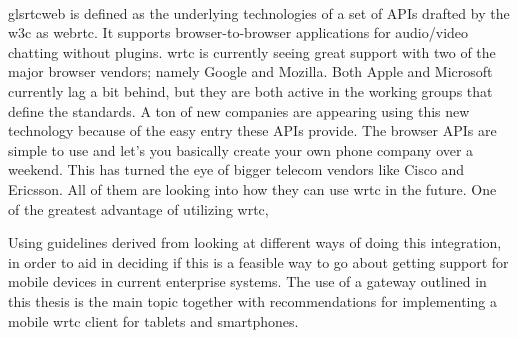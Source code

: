 \\gls{rtcweb} is defined as the underlying technologies of a set of APIs drafted by the \gls{w3c} as \gls{webrtc}. It supports browser-to-browser applications for audio/video chatting without plugins. \gls{wrtc} is currently seeing great support with two of the major browser vendors; namely Google and Mozilla. Both Apple and Microsoft currently lag a bit behind, but they are both active in the working groups that define the standards. A ton of new companies are appearing using this new technology because of the easy entry these APIs provide. The browser APIs are simple to use and let's you basically create your own phone company over a weekend. This has turned the eye of bigger telecom vendors like Cisco and Ericsson. All of them are looking into how they can use \gls{wrtc} in the future. One of the greatest advantage of utilizing \gls{wrtc},%

Using guidelines derived from looking at different ways of doing this integration, in order to aid in deciding if this is a feasible way to go about getting support for mobile devices in current enterprise systems. The use of a gateway outlined in this thesis is the main topic together with recommendations for implementing a mobile \gls{wrtc} client for tablets and smartphones.
